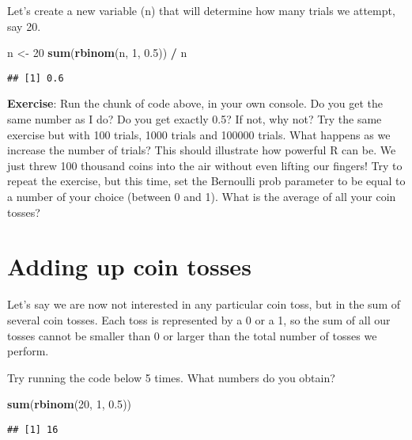 \documentclass[
]{book}
\newenvironment{Shaded}{\begin{snugshade}}{\end{snugshade}}
\newcommand{\DecValTok}[1]{\textcolor[rgb]{0.00,0.00,0.81}{#1}}
\newcommand{\FloatTok}[1]{\textcolor[rgb]{0.00,0.00,0.81}{#1}}
\newcommand{\KeywordTok}[1]{\textcolor[rgb]{0.13,0.29,0.53}{\textbf{#1}}}
\newcommand{\NormalTok}[1]{#1}
\newcommand{\OperatorTok}[1]{\textcolor[rgb]{0.81,0.36,0.00}{\textbf{#1}}}
\newcommand{\StringTok}[1]{\textcolor[rgb]{0.31,0.60,0.02}{#1}}
\begin{document}
Let's create a new variable (n) that will determine how many trials we attempt, say 20.

\begin{Shaded}
\begin{Highlighting}[]
\NormalTok{n \textless{}{-}}\StringTok{ }\DecValTok{20}
\KeywordTok{sum}\NormalTok{(}\KeywordTok{rbinom}\NormalTok{(n, }\DecValTok{1}\NormalTok{, }\FloatTok{0.5}\NormalTok{)) }\OperatorTok{/}\StringTok{ }\NormalTok{n}
\end{Highlighting}
\end{Shaded}

\begin{verbatim}
## [1] 0.6
\end{verbatim}

\textbf{Exercise}: Run the chunk of code above, in your own console. Do you get the same number as I do? Do you get exactly 0.5? If not, why not? Try the same exercise but with 100 trials, 1000 trials and 100000 trials. What happens as we increase the number of trials? This should illustrate how powerful R can be. We just threw 100 thousand coins into the air without even lifting our fingers! Try to repeat the exercise, but this time, set the Bernoulli prob parameter to be equal to a number of your choice (between 0 and 1). What is the average of all your coin tosses?

\hypertarget{adding-up-coin-tosses}{%
\section{Adding up coin tosses}\label{adding-up-coin-tosses}}

Let's say we are now not interested in any particular coin toss, but in the sum of several coin tosses. Each toss is represented by a 0 or a 1, so the sum of all our tosses cannot be smaller than 0 or larger than the total number of tosses we perform.

Try running the code below 5 times. What numbers do you obtain?

\begin{Shaded}
\begin{Highlighting}[]
\KeywordTok{sum}\NormalTok{(}\KeywordTok{rbinom}\NormalTok{(}\DecValTok{20}\NormalTok{, }\DecValTok{1}\NormalTok{, }\FloatTok{0.5}\NormalTok{))}
\end{Highlighting}
\end{Shaded}

\begin{verbatim}
## [1] 16
\end{verbatim}
\end{document}

